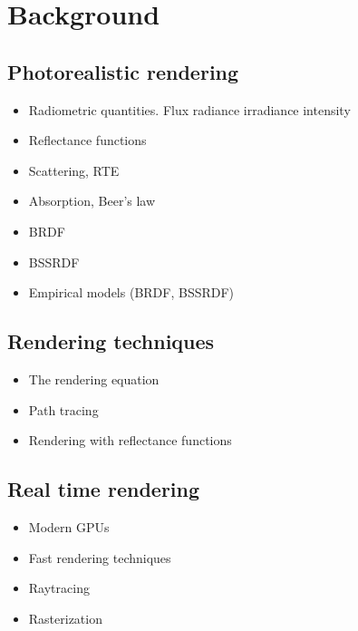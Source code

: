 \chapter{Background}

\section{Photorealistic rendering}
\begin{itemize}
\item Radiometric quantities. Flux radiance irradiance intensity
\item Reflectance functions
\item Scattering, RTE
\item Absorption, Beer's law
\item BRDF
\item BSSRDF
\item Empirical models (BRDF, BSSRDF)
\end{itemize}
\section{Rendering techniques}
\begin{itemize}
\item The rendering equation
\item Path tracing
\item Rendering with reflectance functions
\end{itemize}

\section{Real time rendering} 
\begin{itemize}
\item Modern GPUs
\item Fast rendering techniques
\item Raytracing 
\item Rasterization
\end{itemize}
